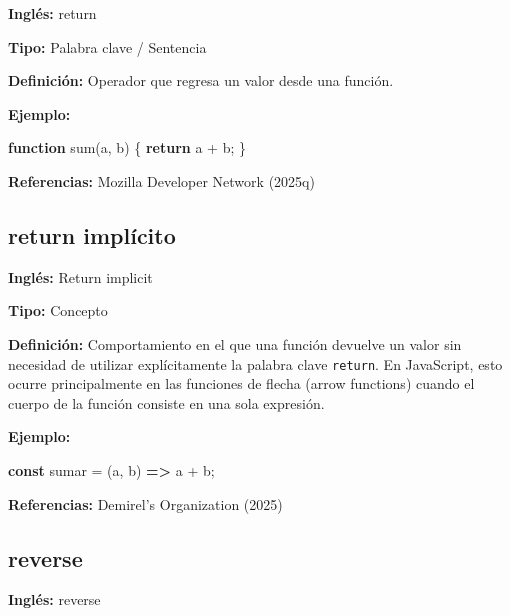\documentclass[
  letterpaper,
  DIV=11,
  numbers=noendperiod]{scrreprt}
\newenvironment{Shaded}{\begin{snugshade}}{\end{snugshade}}
\newcommand{\ControlFlowTok}[1]{\textcolor[rgb]{0.00,0.23,0.31}{\textbf{#1}}}
\newcommand{\FunctionTok}[1]{\textcolor[rgb]{0.28,0.35,0.67}{#1}}
\newcommand{\KeywordTok}[1]{\textcolor[rgb]{0.00,0.23,0.31}{\textbf{#1}}}
\newcommand{\NormalTok}[1]{\textcolor[rgb]{0.00,0.23,0.31}{#1}}
\newcommand{\OperatorTok}[1]{\textcolor[rgb]{0.37,0.37,0.37}{#1}}
\let\oldsubsection\subsection
\renewcommand{\subsection}{\phantomsection\oldsubsection}
\begin{document}
\textbf{Inglés:} return

\textbf{Tipo:} Palabra clave / Sentencia

\textbf{Definición:} Operador que regresa un valor desde una función.

\textbf{Ejemplo:}

\begin{Shaded}
\begin{Highlighting}[]
\KeywordTok{function} \FunctionTok{sum}\NormalTok{(a}\OperatorTok{,}\NormalTok{ b) \{}
  \ControlFlowTok{return}\NormalTok{ a }\OperatorTok{+}\NormalTok{ b}\OperatorTok{;}
\NormalTok{\}}
\end{Highlighting}
\end{Shaded}

\textbf{Referencias:} Mozilla Developer Network (2025q)

\subsection*{return implícito}\label{glos-return_impluxedcito}

\textbf{Inglés:} Return implicit

\textbf{Tipo:} Concepto

\textbf{Definición:} Comportamiento en el que una función devuelve un
valor sin necesidad de utilizar explícitamente la palabra clave
\texttt{return}. En JavaScript, esto ocurre principalmente en las
funciones de flecha (arrow functions) cuando el cuerpo de la función
consiste en una sola expresión.

\textbf{Ejemplo:}

\begin{Shaded}
\begin{Highlighting}[]
\KeywordTok{const}\NormalTok{ sumar }\OperatorTok{=}\NormalTok{ (a}\OperatorTok{,}\NormalTok{ b) }\KeywordTok{=\textgreater{}}\NormalTok{ a }\OperatorTok{+}\NormalTok{ b}\OperatorTok{;}
\end{Highlighting}
\end{Shaded}

\textbf{Referencias:} Demirel's Organization (2025)

\subsection*{reverse}\label{glos-reverse}

\textbf{Inglés:} reverse
\end{document}
